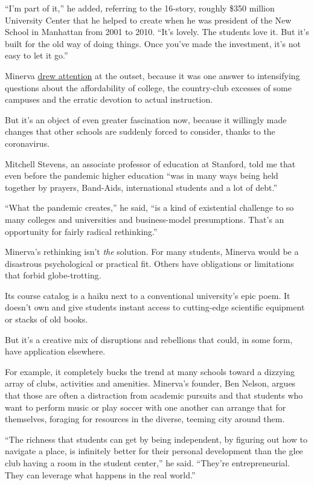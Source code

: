 ``I'm part of it,'' he added, referring to the 16-story, roughly \$350
million University Center that he helped to create when he was president
of the New School in Manhattan from 2001 to 2010. ``It's lovely. The
students love it. But it's built for the old way of doing things. Once
you've made the investment, it's not easy to let it go.''

Minerva
\href{https://www.theatlantic.com/magazine/archive/2014/09/the-future-of-college/375071/}{drew
attention} at the outset, because it was one answer to intensifying
questions about the affordability of college, the country-club excesses
of some campuses and the erratic devotion to actual instruction.

But it's an object of even greater fascination now, because it willingly
made changes that other schools are suddenly forced to consider, thanks
to the coronavirus.

Mitchell Stevens, an associate professor of education at Stanford, told
me that even before the pandemic higher education ``was in many ways
being held together by prayers, Band-Aids, international students and a
lot of debt.''

``What the pandemic creates,'' he said, ``is a kind of existential
challenge to so many colleges and universities and business-model
presumptions. That's an opportunity for fairly radical rethinking.''

Minerva's rethinking isn't \emph{the} solution. For many students,
Minerva would be a disastrous psychological or practical fit. Others
have obligations or limitations that forbid globe-trotting.

Its course catalog is a haiku next to a conventional university's epic
poem. It doesn't own and give students instant access to cutting-edge
scientific equipment or stacks of old books.

But it's a creative mix of disruptions and rebellions that could, in
some form, have application elsewhere.

For example, it completely bucks the trend at many schools toward a
dizzying array of clubs, activities and amenities. Minerva's founder,
Ben Nelson, argues that those are often a distraction from academic
pursuits and that students who want to perform music or play soccer with
one another can arrange that for themselves, foraging for resources in
the diverse, teeming city around them.

``The richness that students can get by being independent, by figuring
out how to navigate a place, is infinitely better for their personal
development than the glee club having a room in the student center,'' he
said. ``They're entrepreneurial. They can leverage what happens in the
real world.''


